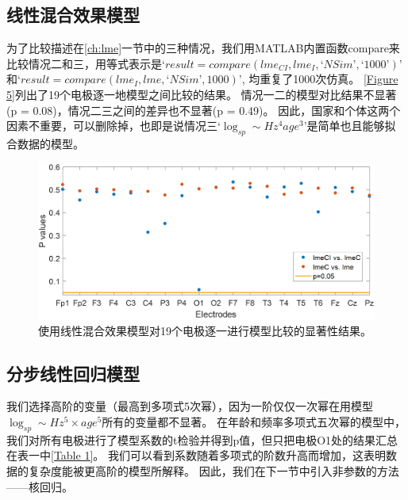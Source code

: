 \subsection{线性混合效果模型}
为了比较描述在\ref{ch:lme}一节中的三种情况，我们用MATLAB内置函数compare来比较情况二和三，用等式表示是$‘result = compare(lme_{CI}, lme_{I}, ‘NSim’, ‘1000’)’$和$‘result = compare (lme_{I}, lme, ‘NSim’, 1000)’$, 均重复了1000次仿真。 \ref{Figure 5}列出了19个电极逐一地模型之间比较的结果。 情况一二的模型对比结果不显著(p = 0.08)，情况二三之间的差异也不显著(p = 0.49)。 因此，国家和个体这两个因素不重要，可以删除掉，也即是说情况三$‘\log_{sp}\sim{Hz^4age^3}’$是简单也且能够拟合数据的模型。
\begin{figure}[!ht]
\includegraphics[width=15cm]{pic/Norm/figure5.png}
\caption{使用线性混合效果模型对19个电极逐一进行模型比较的显著性结果。}
\label{fig5}
\end{figure}

\subsection{分步线性回归模型}
我们选择高阶的变量（最高到多项式5次幂），因为一阶仅仅一次幂在用模型$\log_{sp}\sim{Hz^5\times{age^5}}$所有的变量都不显著。 在年龄和频率多项式五次幂的模型中，我们对所有电极进行了模型系数的t检验并得到p值，但只把电极O1处的结果汇总在表一中\ref{Table 1}。 
我们可以看到系数随着多项式的阶数升高而增加，这表明数据的复杂度能被更高阶的模型所解释。 因此，我们在下一节中引入非参数的方法——核回归。

